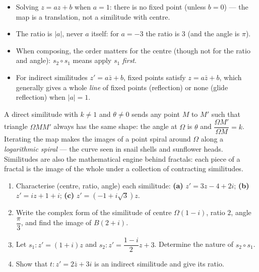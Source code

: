 \documentclass[11pt]{article}
\begin{document}
\begin{attention}
\begin{itemize}
\item Solving $z = az + b$ when $a = 1$: there is no fixed point (unless $b = 0$) --- the map is a translation, not a similitude with centre.
\item The ratio is $|a|$, never $a$ itself: for $a = -3$ the ratio is $3$ (and the angle is $\pi$).
\item When composing, the order matters for the centre (though not for the ratio and angle): $s_2 \circ s_1$ means apply $s_1$ \emph{first}.
\item For indirect similitudes $z' = a\bar{z} + b$, fixed points satisfy $z = a\bar{z} + b$, which generally gives a whole \emph{line} of fixed points (reflection) or none (glide reflection) when $|a| = 1$.
\end{itemize}
\end{attention}

\begin{savaistu}
A direct similitude with $k \neq 1$ and $\theta \neq 0$ sends any point $M$ to $M'$ such that triangle $\Omega M M'$ always has the same shape: the angle at $\Omega$ is $\theta$ and $\dfrac{\Omega M'}{\Omega M} = k$. Iterating the map makes the images of a point spiral around $\Omega$ along a \emph{logarithmic spiral} --- the curve seen in snail shells and sunflower heads. Similitudes are also the mathematical engine behind fractals: each piece of a fractal is the image of the whole under a collection of contracting similitudes.
\end{savaistu}

\begin{exercice}[Practice]
\begin{enumerate}
\item Characterise (centre, ratio, angle) each similitude: \textbf{(a)} $z' = 3z - 4 + 2i$; \textbf{(b)} $z' = iz + 1 + i$; \textbf{(c)} $z' = (-1 + i\sqrt{3})z$.
\item Write the complex form of the similitude of centre $\Omega(1 - i)$, ratio $2$, angle $\dfrac{\pi}{3}$, and find the image of $B(2 + i)$.
\item Let $s_1: z' = (1+i)z$ and $s_2: z' = \dfrac{1-i}{2}z + 3$. Determine the nature of $s_2 \circ s_1$.
\item Show that $t: z' = 2\bar{z} + 3i$ is an indirect similitude and give its ratio.
\end{enumerate}
\end{exercice}
\end{document}
